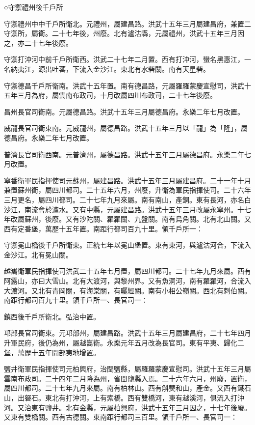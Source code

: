 ○守禦禮州後千戶所

守禦禮州中中千戶所衛北。元禮州，屬建昌路。洪武十五年三月屬建昌府，兼置二守禦所，屬衛。二十七年後，州廢。北有瀘沽縣，元屬禮州，洪武十五年三月因之，亦二十七年後廢。

守禦打沖河中前千戶所衛西。洪武二十七年二月置。西有打沖河，蠻名黑惠江，一名納夷江，源出吐蕃，下流入金沙江。東北有水砦關。南有天星砦。

守禦德昌千戶所衛南。洪武十五年置。南有德昌路，元屬羅羅蒙慶宣慰司，洪武十五年三月為府，屬雲南布政司，十月改屬四川布政司，二十七年後廢。

昌州長官司衛南。元屬德昌路。洪武十五年三月屬德昌府。永樂二年七月改置。

威龍長官司衛東南。元威龍州，屬德昌路。洪武十五年三月以「龍」為「隆」，屬德昌府。永樂二年七月改置。

普濟長官司衛西南。元普濟州，屬德昌路。洪武十五年三月屬德昌府。永樂二年七月改置。

寧番衛軍民指揮使司元蘇州，屬建昌路。洪武十五年三月屬建昌府。二十一年十月兼置蘇州衛，屬四川都司。二十五年六月，州廢，升衛為軍民指揮使司。二十六年三月更名，屬四川都司。二十七年九月來屬。南有南山，產銅。東有長河，亦名白沙江，南流會於瀘水。又有中縣，元屬建昌路。洪武十五年三月改屬永寧州。十七年改屬蘇州，後廢。又有沙陀關、羅羅關、九盤關。南有烏角關。北有北山關。又西有定番堡，萬歷十五年置。南距行都司百九十里。領千戶所一：

守禦冕山橋後千戶所衛東。正統七年以冕山堡置。東有東河，與瀘沽河合，下流入金沙江。北有冕山關。

越巂衛軍民指揮使司洪武二十五年七月置，屬四川都司。二十七年九月來屬。西有阿露山，亦曰大雪山。北有大渡河，與黎州界。又有魚洞河，南有羅羅河，合流入大渡河。又北有青岡關，有海棠關，有曬經關。南有小相公嶺關。西北有刺伯關。南距行都司百九十里。領千戶所一、長官司一：

鎮西後千戶所衛北。弘治中置。

邛部長官司衛東。元邛部州，屬建昌路。洪武十五年三月屬建昌府，二十七年四月升軍民府，後仍為州，屬越巂衛。永樂元年五月改為長官司。東有平夷、歸化二堡，萬歷十五年開部夷地增置。

鹽井衛軍民指揮使司元柏興府，治閏鹽縣，屬羅羅蒙慶宣慰司。洪武十五年三月屬雲南布政司。二十四年二月降為州，省閏鹽縣入焉。二十六年六月，州廢，置衛，屬四川都司。二十七年九月來屬。南有柏林山。西有斛僰和山，產金。又西有鐵石山，出砮石。東北有打沖河，上有索橋。西有雙橋河，東有越溪河，俱流入打沖河。又治東有鹽井。北有金縣，元屬柏興府，洪武十五年三月因之，十七年後廢。又東有雙橋關。西有古德關。東南距行都司三百里。領千戶所一、長官司一：

